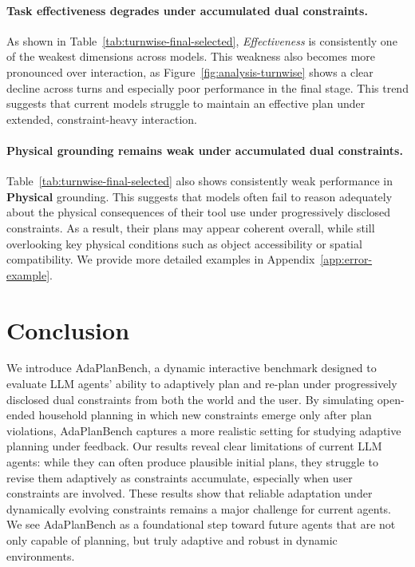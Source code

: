 \documentclass{llmxive}
\providecommand{\bench}[1]{AdaPlanBench}
\begin{document}
\paragraph{Task effectiveness degrades under accumulated dual constraints.}
As shown in Table~\ref{tab:turnwise-final-selected}, \textit{Effectiveness} is consistently one of the weakest dimensions across models. 
This weakness also becomes more pronounced over interaction, as Figure~\ref{fig:analysis-turnwise} shows a clear decline across turns and especially poor performance in the final stage. 
This trend suggests that current models struggle to maintain an effective plan under extended, constraint-heavy interaction.


\paragraph{Physical grounding remains weak under accumulated dual constraints.}
Table~\ref{tab:turnwise-final-selected} also shows consistently weak performance in \textbf{Physical} grounding. 
This suggests that models often fail to reason adequately about the physical consequences of their tool use under progressively disclosed constraints. 
As a result, their plans may appear coherent overall, while still overlooking key physical conditions such as object accessibility or spatial compatibility.
We provide more detailed examples in Appendix~\ref{app:error-example}.


\section{Conclusion}

We introduce \bench{}, a dynamic interactive benchmark designed to evaluate LLM agents’ ability to adaptively plan and re-plan under progressively disclosed dual constraints from both the world and the user. 
By simulating open-ended household planning in which new constraints emerge only after plan violations, \bench{} captures a more realistic setting for studying adaptive planning under feedback. 
Our results reveal clear limitations of current LLM agents: while they can often produce plausible initial plans, they struggle to revise them adaptively as constraints accumulate, especially when user constraints are involved. 
These results show that reliable adaptation under dynamically evolving constraints remains a major challenge for current agents.
We see \bench{} as a foundational step toward future agents that are not only capable of planning, but truly adaptive and robust in dynamic environments.
\end{document}
